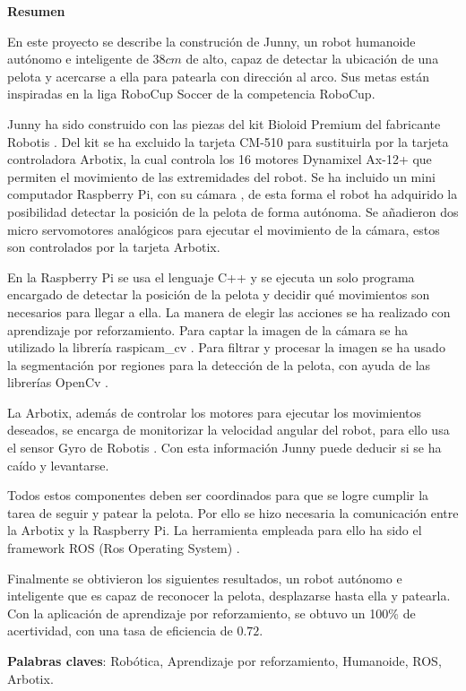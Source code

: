 \setcounter{page}{4}
\begin{center}
	{\bf Resumen}  %
\end{center}	


En este proyecto se describe la construción de Junny, un robot humanoide autónomo e inteligente de $38 cm $ de alto, capaz de detectar la ubicación de una pelota y acercarse a ella para patearla con dirección al arco. Sus metas están inspiradas en la liga RoboCup Soccer de la competencia RoboCup.

Junny ha sido construido con las piezas del kit Bioloid Premium del fabricante Robotis \cite{robotics}. Del kit se ha excluido la tarjeta CM-510 para sustituirla por la tarjeta controladora Arbotix, la cual controla los 16 motores Dynamixel Ax-12+ que permiten el movimiento de las extremidades del robot. Se ha incluido un mini computador Raspberry Pi, con su cámara \cite{raspberrycam}, de esta forma el robot ha adquirido la posibilidad detectar la posición de la pelota de forma autónoma. Se añadieron dos micro servomotores analógicos para ejecutar el movimiento de la c\'amara, estos son controlados por la tarjeta Arbotix. 

En la Raspberry Pi se usa el lenguaje C++ y se ejecuta un solo programa encargado de detectar la posición de la pelota y decidir qué movimientos son necesarios para llegar a ella. La manera de elegir las acciones se ha realizado con aprendizaje por reforzamiento. Para captar la imagen de la cámara se ha utilizado la librería raspicam\_cv \cite{camara}. Para filtrar y procesar la imagen se ha usado la segmentaci\'on por regiones para la detecci\'on de la pelota, con ayuda de las librerías OpenCv \cite{opencv}. 

La Arbotix, además de controlar los motores para ejecutar los movimientos deseados, se encarga de monitorizar la velocidad angular del robot, para ello usa el sensor Gyro de Robotis \cite{gyro}. Con esta información Junny puede deducir si se ha caído y levantarse. 

Todos estos componentes deben ser coordinados para que se logre cumplir la tarea de seguir y patear la pelota. Por ello se hizo necesaria la comunicación entre la Arbotix y la Raspberry Pi. La herramienta 
empleada para ello ha sido el \gls{framework} ROS (Ros Operating System) \cite{ros}. 

Finalmente se obtivieron los siguientes resultados, un robot aut\'onomo e inteligente que es capaz de reconocer la pelota, desplazarse hasta ella y patearla. Con la aplicaci\'on de aprendizaje por reforzamiento, se obtuvo un 100\% de acertividad, con una tasa de eficiencia de $0.72$.

\textbf{Palabras claves}: Rob\'otica, Aprendizaje por reforzamiento, Humanoide, ROS, Arbotix.


